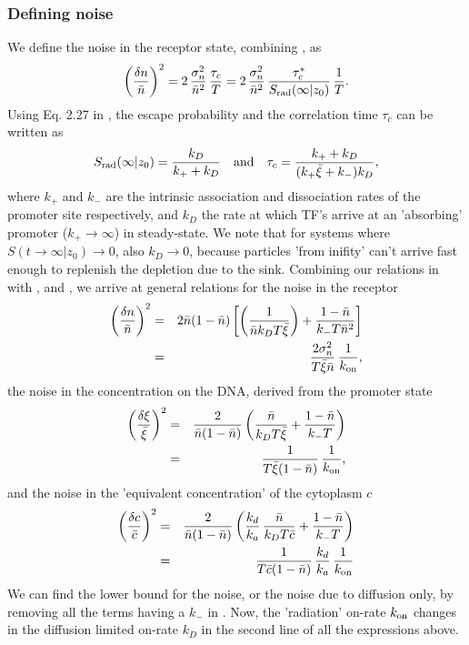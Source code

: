 \subsubsection{Defining noise}
We define the noise in the receptor state, combining , as
\begin{equation}
 \left( \frac{\delta n}{\bar{n}} \right)^2 = 2 \, \frac{\sigma_n^2}{\bar{n}^2} \, \frac{\tau_c}{T} = 2 \, \frac{\sigma_n^2}{\bar{n}^2} \, \frac{\tau_c^*}{S_{\rm rad}(\infty|z_0)} \, \frac{1}{T}.
 \elabel{EqProNoise}
\end{equation}
Using Eq. 2.27 in \cite{Agmon1990}, the escape probability and the correlation time $\tau_c$ can be written as
\begin{equation}
 S_{\rm rad}(\infty|z_0) = \frac{k_D}{k_+ + k_D} \quad {\rm and} \quad \tau_c = \frac{k_+ + k_D}{(k_+ \bar{\xi} + k_-) k_D},
 \elabel{Sinfty}
\end{equation}
where $k_+$ and $k_-$ are the intrinsic association and dissociation rates of the promoter site respectively, and $k_D$ the rate at which TF's arrive at an 'absorbing' promoter ($k_+ \to \infty$) in steady-state. We note that for systems where $S(t\to\infty|z_0)\to0$, also $k_D\to0$, because particles 'from inifity' can't arrive fast enough to replenish the depletion due to the sink. Combining our relations in  with ,  and , we arrive at general relations for the noise in the receptor
\begin{eqnarray}
 \elabel{NoisePro}
 \left( \frac{\delta n}{\bar{n}} \right)^2 & = & 2 \bar{n}(1-\bar{n})\left[\left( \frac{1}{\bar{n} k_D T \bar{\xi}} \right)+\frac{1-\bar{n}}{k_- T \bar{n}^2} \right] \\
 & = & \frac{2 \sigma_n^2}{T \bar{\xi} \bar{n}} \, \frac{1}{k_{\rm on}},
\end{eqnarray}
the noise in the concentration on the DNA, derived from the promoter state
\begin{eqnarray}
 \elabel{NoiseXi}
 \left( \frac{\delta \xi}{\bar{\xi}} \right)^2 & = & \frac{2}{\bar{n}(1-\bar{n})} \left( \frac{\bar{n}}{k_D T \bar{\xi}} + \frac{1-\bar{n}}{k_- T}  \right) \\
  & = & \frac{1}{T \bar{\xi} (1 - \bar{n})} \, \frac{1}{k_{\rm on}},
\end{eqnarray}
and the noise in the 'equivalent concentration' of the cytoplasm $c$
\begin{eqnarray}
 \elabel{NoiseC} 
 \left( \frac{\delta c}{\bar{c}} \right)^2 & = & \frac{2}{\bar{n}(1-\bar{n})} \left( \frac{k_d}{k_a} \, \frac{\bar{n}}{k_D T \bar{c}} + \frac{1-\bar{n}}{k_- T}  \right) \\ \elabel{NoiseC2} 
 & = & \frac{1}{T \bar{c} (1 - \bar{n})} \, \frac{k_d}{k_a} \, \frac{1}{k_{\rm on}}
\end{eqnarray}
We can find the lower bound for the noise, or the noise due to diffusion only, by removing all the terms having a $k_-$ in . Now, the 'radiation' on-rate $k_{\rm on}$ changes in the diffusion limited on-rate $k_D$ in the second line of all the expressions above. 

